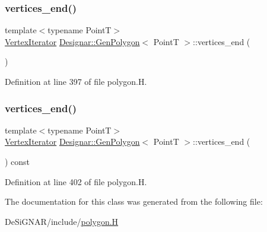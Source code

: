 \subsubsection{\texorpdfstring{vertices\+\_\+end()}{vertices\_end()}\hspace{0.1cm}{\footnotesize\ttfamily [1/2]}}
{\footnotesize\ttfamily template$<$typename PointT$>$ \\
\hyperlink{class_designar_1_1_gen_polygon_1_1_vertex_iterator}{Vertex\+Iterator} \hyperlink{class_designar_1_1_gen_polygon}{Designar\+::\+Gen\+Polygon}$<$ PointT $>$\+::vertices\+\_\+end (\begin{DoxyParamCaption}{ }\end{DoxyParamCaption})\hspace{0.3cm}{\ttfamily [inline]}}



Definition at line 397 of file polygon.\+H.

\mbox{\label{class_designar_1_1_gen_polygon_ad409613d032d91895921d60e27250a14}} 
\subsubsection{\texorpdfstring{vertices\+\_\+end()}{vertices\_end()}\hspace{0.1cm}{\footnotesize\ttfamily [2/2]}}
{\footnotesize\ttfamily template$<$typename PointT$>$ \\
\hyperlink{class_designar_1_1_gen_polygon_1_1_vertex_iterator}{Vertex\+Iterator} \hyperlink{class_designar_1_1_gen_polygon}{Designar\+::\+Gen\+Polygon}$<$ PointT $>$\+::vertices\+\_\+end (\begin{DoxyParamCaption}{ }\end{DoxyParamCaption}) const\hspace{0.3cm}{\ttfamily [inline]}}



Definition at line 402 of file polygon.\+H.



The documentation for this class was generated from the following file\+:\begin{DoxyCompactItemize}
\item 
De\+Si\+G\+N\+A\+R/include/\hyperlink{polygon_8_h}{polygon.\+H}\end{DoxyCompactItemize}
